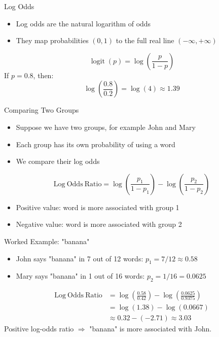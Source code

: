 \documentclass[11pt,aspectratio=43]{beamer}
\begin{document}
\begin{frame}{Log Odds}
\begin{itemize}
\item Log odds are the natural logarithm of odds
\item They map probabilities $(0,1)$ to the full real line $(-\infty,+\infty)$
\end{itemize}
\[
\operatorname{logit}(p)=\log\left(\frac{p}{1-p}\right)
\]
If $p=0.8$, then:
\[
\log\left(\frac{0.8}{0.2}\right)=\log(4)\approx1.39
\]
\end{frame}

\begin{frame}{Comparing Two Groups}
\begin{itemize}
\item Suppose we have two groups, for example John and Mary
\item Each group has its own probability of using a word
\item We compare their log odds
\end{itemize}
\[
\mathrm{Log\ Odds\ Ratio}=
\log\left(\frac{p_1}{1-p_1}\right)-
\log\left(\frac{p_2}{1-p_2}\right)
\]
\begin{itemize}
\item Positive value: word is more associated with group 1
\item Negative value: word is more associated with group 2
\end{itemize}
\end{frame}

\begin{frame}{Worked Example: "banana"}
\small
\begin{itemize}
\item John says "banana" in 7 out of 12 words: $p_1=7/12\approx0.58$
\item Mary says "banana" in 1 out of 16 words: $p_2=1/16=0.0625$
\end{itemize}
\[
\begin{aligned}
\mathrm{Log\ Odds\ Ratio}
&=\log\left(\frac{0.58}{0.42}\right)
-\log\left(\frac{0.0625}{0.9375}\right)\\
&=\log(1.38)-\log(0.0667)\\
&\approx0.32-(-2.71)\approx3.03
\end{aligned}
\]
Positive log-odds ratio $\Rightarrow$ "banana" is more associated with John.
\end{frame}
\end{document}
